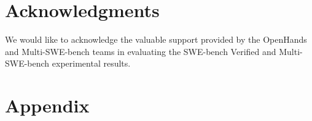 \documentclass{article}
\begin{document}





\section{Acknowledgments}
We would like to acknowledge the valuable support provided by the OpenHands and Multi-SWE-bench teams in evaluating the SWE-bench Verified and Multi-SWE-bench experimental results.


\newpage
\printbibliography[title={References}]

\newpage
\appendix
\section*{Appendix}

\end{document}

